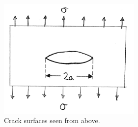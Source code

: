 
\begin{figure}
  \centering
  \includegraphics[width=7cm]{./images/physics_crack_surfaces_from_above.png}
  \caption{Crack surfaces seen from above.}
  \label{fig:crack-surfaces-from-above}
\end{figure}










